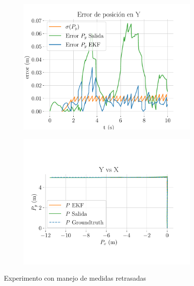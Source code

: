 \begin{figure}
\begin{subfigure}[t]{0.49\textwidth}
		\includegraphics[width=\textwidth]{estimador_px4/im_simu/handle_delay/Py_error}
		\caption{}
		\label{fig:py-error}
	\end{subfigure}
	\quad
	\begin{subfigure}[t]{0.49\textwidth}
		\centering
		\includegraphics[width=\textwidth]{estimador_px4/im_simu/handle_delay/tray}
		\caption{}
	\end{subfigure}
	\quad
	\caption{Experimento con manejo de medidas retrasadas}
	\label{fig:handle}
\end{figure}





\endinput
